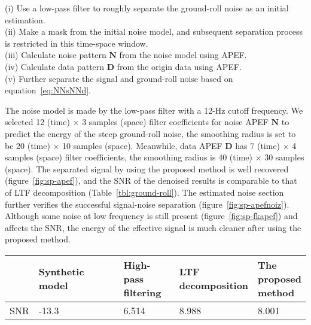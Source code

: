 (i) Use a low-pass filter to roughly separate the ground-roll noise
as an initial estimation.\\
(ii) Make a mask from the initial noise model, and subsequent
separation process is restricted in this time-space window.\\
(iii) Calculate noise pattern $\mathbf{N}$ from the noise model using APEF.\\
(iv) Calculate data pattern $\mathbf{D}$ from the origin data using APEF.\\
(v) Further separate the signal and ground-roll noise based on
equation~\ref{eq:NNsNNd}.

The noise model is made by the low-pass filter with a 12-Hz cutoff
frequency. We selected 12 (time) $\times$ 3 samples (space) filter
coefficients for noise APEF $\mathbf{N}$ to predict the energy of
the steep ground-roll noise, the smoothing radius is set to be 20
(time) $\times$ 10 samples (space). Meanwhile, data APEF $\mathbf{D}$
has 7 (time) $\times$ 4 samples (space) filter coefficients, the
smoothing radius is 40 (time) $\times$ 30 samples (space).
The separated signal by using the proposed method is well recovered
(figure~\ref{fig:sp-apef}), and the SNR of the denoised results is
comparable to that of LTF decomposition (Table~\ref{tbl:ground-roll}).
The estimated noise section further verifies the successful signal-noise
separation (figure~\ref{fig:sp-apefnoiz}). Although some noise at low
frequency is still present (figure~\ref{fig:sp-fkapef}) and affects
the SNR, the energy of the effective signal is much cleaner after
using the proposed method.

{
    \begin{center}
        \begin{tabular}{p{70pt}p{70pt}p{70pt}p{70pt}p{70pt}}
            \hline
                & Synthetic model & \tabincell{c}{High-pass                 \\filtering} & \tabincell{c}{LTF\\decomposition} & \tabincell{c}{The\\proposed\\method} \\
            \hline
            SNR & -13.3           & 6.514                   & 8.988 & 8.001 \\
            \hline
        \end{tabular}
    \end{center}
}

